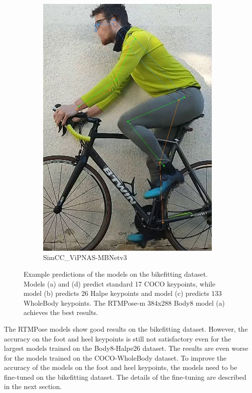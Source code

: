 \begin{figure}[htbp]
\begin{subfigure}[b]{\imgwidth}
        \includegraphics[width=\smallimgwidth]{obrazky-figures/simcc_vipnas-mbv3_8xb64-210e_coco-256x192_zlute_196_crop.jpg}
        \caption{SimCC\_ViPNAS-MBNetv3}


    \end{subfigure}
    \caption{
        Example predictions of the models on the bikefitting dataset. Models (a) and (d) predict standard 17 COCO keypoints, while model (b) predicts 26 Halpe keypoints and model (c) predicts 133 WholeBody keypoints. The RTMPose-m 384x288 Body8 model (a) achieves the best results.}
    \label{fig:evaluation_examples}

\end{figure}

The RTMPose models show good results on the bikefitting dataset. However, the accuracy on the foot and heel keypoints is still not satisfactory even for the largest models trained on the Body8-Halpe26 dataset. The results are even worse for the models trained on the COCO-WholeBody dataset. To improve the accuracy of the models on the foot and heel keypoints, the models need to be fine-tuned on the bikefitting dataset. The details of the fine-tuning are described in the next section.

